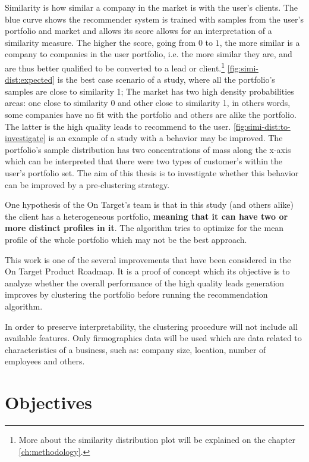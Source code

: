 Similarity is how similar a company in the market is with the user's clients. The blue curve shows the recommender system is trained with samples from the user's portfolio and market and allows its score allows for an interpretation of a similarity measure. The higher the score, going from $0$ to $1$, the more similar is a company to companies in the user portfolio, i.e. the more similar they are, and are thus better qualified to be converted to a lead or client.\footnote{More about the similarity distribution plot will be explained on the chapter \ref{ch:methodology}.}
\ref{fig:simi-dist:expected} is the best case scenario of a study, where all the portfolio's samples are close to similarity 1; The market has two high density probabilities areas: one close to similarity 0 and other close to similarity 1, in others words, some companies have no fit with the portfolio and others are alike the portfolio. The latter is the high quality leads to recommend to the user. \ref{fig:simi-dist:to-investigate} is an example of a study with a behavior may be improved. The portfolio's sample distribution has two concentrations of mass along the x-axis which can be interpreted that there were two types of customer's within the user's portfolio set. The aim of this thesis is to investigate whether this behavior can be improved by a pre-clustering strategy.

One hypothesis of the On Target's team is that in this study (and others alike) the client has a heterogeneous portfolio, \textbf{meaning that it can have two or more distinct profiles in it}. The algorithm tries to optimize for the mean profile of the whole portfolio which may not be the best approach.

This work is one of the several improvements that have been considered in the On Target Product Roadmap. It is a proof of concept which its objective is to analyze whether the overall performance of the high quality leads generation improves by clustering the portfolio before running the recommendation algorithm. 

In order to preserve interpretability, the clustering procedure will not include all available features. Only firmographics data will be used \cite{wikipedia_firmographics} which are data related to characteristics of a business, such as: company size, location, number of employees and others.


\section{Objectives}

